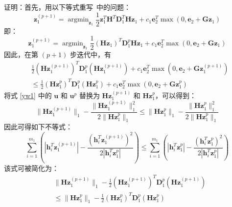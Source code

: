证明：首先，用以下等式重写\ 中的问题：
\begin{equation}
\mathbf{z}^{(p+1)}_{1}=\mathop{\arg\min}_{\mathbf{z}_{1}}
\frac{1}{2}\mathbf{z}^{T}_{1}\mathbf{H}^{T}\mathbf{D}^{T}_{1}\mathbf{H}\mathbf{z}_{1}+
c_{1}\mathbf{e}^{T}_{2}\mathop{\max}(0,\mathbf{e}_{2}+\mathbf{Gz}_{1})
\label{yw3}
\end{equation}
即：
\begin{equation}
\mathbf{z}^{(p+1)}_{1}=\mathop{\arg\min}_{\mathbf{z}_{1}}
\frac{1}{2}(\mathbf{Hz}_{1})^{T}\mathbf{D}^{p}_{1}\mathbf{Hz}_{1}+
c_{1}\mathbf{e}^{T}_{2}\mathop{\max}(0,\mathbf{e}_{2}+\mathbf{Gz}_{1})
\label{yw4}
\end{equation}
因此，在第 $(p+1)$ 步迭代中，有
\begin{equation}
\begin{aligned}
&\frac{1}{2}(\mathbf{Hz}^{(p+1)}_{1})^{T}\mathbf{D}^{p}_{1}(\mathbf{Hz}^{(p+1)}_{1})+
c_{1}\mathbf{e}^{T}_{2}\mathop{\max}(0,\mathbf{e}_{2}+\mathbf{Gz}^{(p+1)}_{1})\\
&\le\frac{1}{2}(\mathbf{Hz}^{p}_{1})^{T}\mathbf{D}^{p}_{1}(\mathbf{Hz}^{p}_{1})+
c_{1}\mathbf{e}^{T}_{2}\mathop{\max}(0,\mathbf{e}_{2}+\mathbf{Gz}^{p}_{1})
\end{aligned}
\label{yw5}
\end{equation}
将式 \eqref{yw1} 中的 $\mathbf{u}$ 和 $\mathbf{u}^p$ 替换为 $\mathbf{Hz}^{(p+1)}_{1}$ 和 $\mathbf{Hz}^{p}_{1}$，可以得到：
\begin{equation}
\|\mathbf{Hz}^{(p+1)}_{1}\|_{1}-\frac{\|\mathbf{Hz}^{(p+1)}_{1}\|^{2}_{1}}{2\|\mathbf{Hz}^{p}_{1}\|_{1}}\le
\|\mathbf{Hz}^{p}_{1}\|_{1}-\frac{\|\mathbf{Hz}^{p}_{1}\|^{2}_{1}}{2\|\mathbf{Hz}^{p}_{1}\|_{1}}
\label{yw6}
\end{equation}
因此可得如下不等式：
\begin{equation}
\sum^{m_1}_{i=1}(\left|\mathbf{h}^{T}_{i}\mathbf{z}^{(p+1)}_1\right|-
\frac{(\mathbf{h}^{T}_{i}\mathbf{z}^{(p+1)}_1)^2}
{2\left|\mathbf{h}^{T}_{i}\mathbf{z}^{p}_{1}\right|})\le
\sum^{m_1}_{i=1}(\left|\mathbf{h}^{T}_{i}\mathbf{z}^{p}_1\right|-
\frac{(\mathbf{h}^{T}_{i}\mathbf{z}^{p}_1)^2}
{2\left|\mathbf{h}^{T}_{i}\mathbf{z}^{p}_{1}\right|})
\label{yw7}
\end{equation}
该式可被简化为：
\begin{equation}
\begin{aligned}
&\|\mathbf{Hz}^{(p+1)}_{1}\|_{1}-\frac{1}{2}(\mathbf{Hz}^{(p+1)}_{1})^{T}\mathbf{D}^{p}_{1}(\mathbf{Hz}^{(p+1)}_{1})\\
&\le\|\mathbf{Hz}^{p}_{1}\|_{1}-\frac{1}{2}(\mathbf{Hz}^{p}_{1})^{T}\mathbf{D}^{p}_{1}(\mathbf{Hz}^{p}_{1})     \end{aligned}
\label{yw8}
\end{equation}
